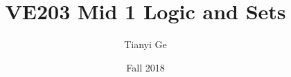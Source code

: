\documentclass{beamer}
\newif\ifpre
\begin{document}
\title{VE203 Mid 1 Logic and Sets}
\institute[FA2018 VE203]{}
\author{Tianyi Ge}
\date{Fall 2018}
\maketitle



\ifpre
\begin{frame}{The End}
  \centering \huge
  Thank You!
\end{frame}
\fi
\end{document}
